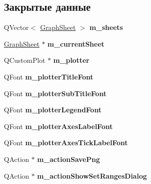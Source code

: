 \subsection*{Закрытые данные}
\begin{DoxyCompactItemize}
\item 
\hypertarget{class_graph_window_a03b672b398d6659d8b3c45cb0bb3b678}{}\label{class_graph_window_a03b672b398d6659d8b3c45cb0bb3b678} 
Q\+Vector$<$ \hyperlink{class_graph_sheet}{Graph\+Sheet} $>$ {\bfseries m\+\_\+sheets}
\item 
\hypertarget{class_graph_window_afb61e9bb808e6699aa29cd62e92d185a}{}\label{class_graph_window_afb61e9bb808e6699aa29cd62e92d185a} 
\hyperlink{class_graph_sheet}{Graph\+Sheet} $\ast$ {\bfseries m\+\_\+current\+Sheet}
\item 
\hypertarget{class_graph_window_add927bb710c37931242a670757d728ea}{}\label{class_graph_window_add927bb710c37931242a670757d728ea} 
Q\+Custom\+Plot $\ast$ {\bfseries m\+\_\+plotter}
\item 
\hypertarget{class_graph_window_af89ca6d320439fa29acb09381d6b5518}{}\label{class_graph_window_af89ca6d320439fa29acb09381d6b5518} 
Q\+Font {\bfseries m\+\_\+plotter\+Title\+Font}
\item 
\hypertarget{class_graph_window_a050668ab58e0cd8b9284f4ceeba882ff}{}\label{class_graph_window_a050668ab58e0cd8b9284f4ceeba882ff} 
Q\+Font {\bfseries m\+\_\+plotter\+Sub\+Title\+Font}
\item 
\hypertarget{class_graph_window_a4072100eb0280206cb00f254f49e72e0}{}\label{class_graph_window_a4072100eb0280206cb00f254f49e72e0} 
Q\+Font {\bfseries m\+\_\+plotter\+Legend\+Font}
\item 
\hypertarget{class_graph_window_a6a2deb2327b56849d617fa00bc38814c}{}\label{class_graph_window_a6a2deb2327b56849d617fa00bc38814c} 
Q\+Font {\bfseries m\+\_\+plotter\+Axes\+Label\+Font}
\item 
\hypertarget{class_graph_window_a7c5bc426aef2b19679ecb9ce7a5f688e}{}\label{class_graph_window_a7c5bc426aef2b19679ecb9ce7a5f688e} 
Q\+Font {\bfseries m\+\_\+plotter\+Axes\+Tick\+Label\+Font}
\item 
\hypertarget{class_graph_window_a8b18154ef9c7f978df94dbae8855d30a}{}\label{class_graph_window_a8b18154ef9c7f978df94dbae8855d30a} 
Q\+Action $\ast$ {\bfseries m\+\_\+action\+Save\+Png}
\item 
\hypertarget{class_graph_window_a6c342da9e826998d3744ec87d5a710a4}{}\label{class_graph_window_a6c342da9e826998d3744ec87d5a710a4} 
Q\+Action $\ast$ {\bfseries m\+\_\+action\+Show\+Set\+Ranges\+Dialog}

\end{DoxyCompactItemize}
